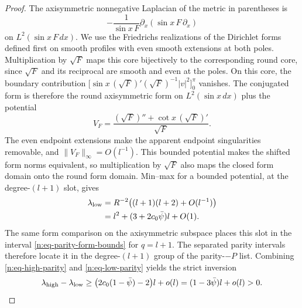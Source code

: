 \begin{proof}
The axisymmetric nonnegative Laplacian of the metric in parentheses
is
\[
 -\frac1{\sin x\,F}\partial_x(\sin x\,F\,\partial_x)
\]
on \(L^2(\sin x\,F\,dx)\).  We use the Friedrichs realizations of
the Dirichlet forms defined first on smooth profiles with even smooth
extensions at both poles.  Multiplication by \(\sqrt F\) maps this
core bijectively to the corresponding round core, since \(\sqrt F\)
and its reciprocal are smooth and even at the poles.  On this core,
the boundary contribution
\(\bigl[\sin x\,(\sqrt F)'(\sqrt F)^{-1}|v|^2\bigr]_0^\pi\)
vanishes.  The conjugated form is therefore the round axisymmetric
form on \(L^2(\sin x\,dx)\) plus the potential
\[
 V_F=\frac{(\sqrt F)''+\cot x\,(\sqrt F)'}{\sqrt F}.
\]
The even endpoint extensions make the apparent endpoint singularities
removable, and \(\|V_F\|_\infty=O(l^{-1})\).  This bounded potential
makes the shifted form norms equivalent, so multiplication by
\(\sqrt F\) also maps the closed form domain onto the round form
domain.  Min--max for a bounded potential, at the degree-\((l+1)\)
slot, gives
\begin{equation}\label{n:eq-low-parity}
 \begin{aligned}
 \lambda_{\rm low}
  &=R^{-2}\bigl((l+1)(l+2)+O(l^{-1})\bigr)\\
  &=l^2+(3+2c_0\bar\psi)l+O(1).
 \end{aligned}
\end{equation}
The same form comparison on the axisymmetric subspace places this
slot in the interval \eqref{n:eq-parity-form-bounds} for \(q=l+1\).
The separated parity intervals therefore locate it in the
degree-\((l+1)\) group of the parity-\(-P\) list.  Combining
\eqref{n:eq-high-parity} and \eqref{n:eq-low-parity} yields the
strict inversion
\begin{equation}\label{n:eq-parity-inversion}
 \lambda_{\rm high}-\lambda_{\rm low}
 \geq\bigl(2c_0(1-\bar\psi)-2\bigr)l+o(l)
 =(1-3\bar\psi)l+o(l)>0.
\end{equation}


\end{proof}
